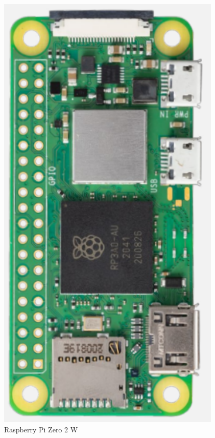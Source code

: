 \begin{figure}[h]
    \centering
    \begin{minipage}[b]{0.45\textwidth}
        \centering
        \includegraphics[width=.6\textwidth]{Imagenes/Vectorial/piZero2W.pdf}
        \caption{Raspberry Pi Zero 2 W}
        \label{fig:piZero2W}
    \end{minipage}
    \hfill
    \begin{minipage}[b]{0.45\textwidth}
        \centering

\end{minipage}
\end{figure}
